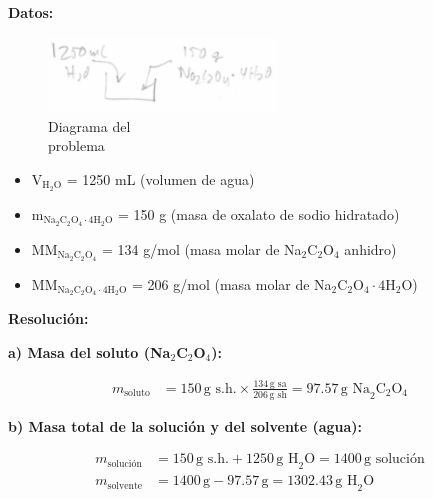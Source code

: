 \documentclass{article}
\begin{document}

\noindent\textbf{Datos:} %
\begin{figure}[H]
    \begin{minipage}[t]{0.3\textwidth} %
        \raggedright %
        \includegraphics[width=\linewidth, height=2cm]{./problema6_diagrama.png} %
        \caption{Diagrama del \\ problema}
    \end{minipage}
\end{figure}
\begin{itemize}
\item V$_{\text{H}_2\text{O}}$ = 1250 mL (volumen de agua)
\item m$_{\text{Na}_2\text{C}_2\text{O}_4\cdot4\text{H}_2\text{O}}$ = 150 g (masa de oxalato de sodio hidratado)
\item MM$_{\text{Na}_2\text{C}_2\text{O}_4}$ = 134 g/mol (masa molar de Na$_2$C$_2$O$_4$ anhidro)
\item MM$_{\text{Na}_2\text{C}_2\text{O}_4\cdot4\text{H}_2\text{O}}$ = 206 g/mol (masa molar de Na$_2$C$_2$O$_4\cdot4\text{H}_2\text{O} $)
\end{itemize}


\noindent\textbf{Resolución:} %

\textbf{a) Masa del soluto (Na$_2$C$_2$O$_4$):}

\begin{align*}
    m_{\text{soluto}} &= 150 \, \text{g s.h.} \times \frac{134 \, \text{g sa}}{206 \, \text{g sh}} = 97.57 \, \text{g Na}_2\text{C}_2\text{O}_4
\end{align*}

\textbf{b) Masa total de la solución y del solvente (agua):}

\begin{align*}
    m_{\text{solución}} &= 150 \, \text{g s.h.} + 1250 \, \text{g H}_2\text{O} = 1400 \, \text{g solución} \\[10pt]
    m_{\text{solvente}} &= 1400 \, \text{g} - 97.57 \, \text{g} = 1302.43 \, \text{g H}_2\text{O}
\end{align*}
\end{document}
